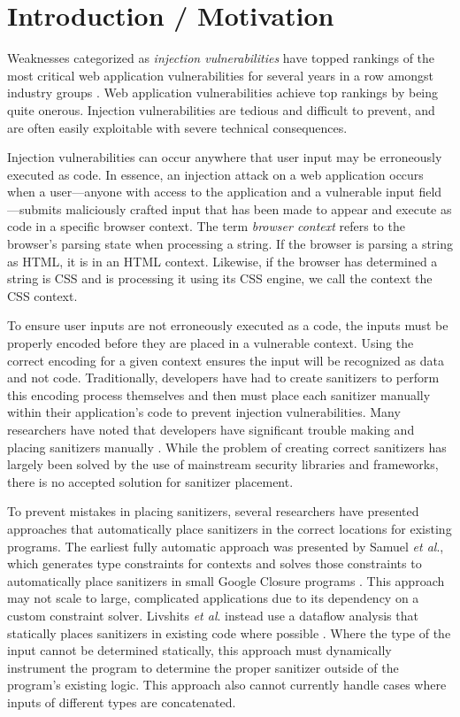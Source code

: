 
\section{Introduction / Motivation}

Weaknesses categorized as \emph{injection vulnerabilities} have topped
rankings of the most critical web application vulnerabilities for
several years in a row amongst industry groups \cite{owasp, cwsans}.
Web application vulnerabilities achieve top rankings by being quite
onerous. Injection vulnerabilities are tedious and
difficult to prevent, and are often easily exploitable with
severe technical consequences.


Injection vulnerabilities can occur anywhere that user input may be erroneously
executed as code. In essence, an injection attack on a web application
occurs when a user---anyone with access to the application and a
vulnerable input field---submits maliciously crafted input that has
been made to appear and execute as code in a specific browser context.
The term \emph{browser context} refers to the browser's parsing state
when processing a string. If the browser is parsing a string as HTML,
it is in an HTML context. Likewise, if the browser has determined
a string is CSS and is processing it using its CSS engine, we call
the context the CSS context.

To ensure user inputs are not erroneously executed as a code, the inputs
must be properly encoded before they are placed in a vulnerable context. Using 
the correct encoding for a given context ensures the input will be recognized as 
data and not code. Traditionally, developers have had to create sanitizers to perform 
this encoding process themselves and then must place each sanitizer manually within
their application's code to prevent injection vulnerabilities. Many researchers have
noted that developers have significant trouble making and placing sanitizers manually . While the problem of creating correct sanitizers has largely been solved by the use of mainstream security libraries and frameworks, there is no accepted solution for sanitizer placement.

To prevent mistakes in placing sanitizers, several researchers have presented approaches 
that automatically place sanitizers in the correct locations for existing programs. 
The earliest fully automatic approach was presented by Samuel \emph{et al}., which
generates type constraints for contexts and solves those constraints to automatically place
sanitizers in small Google Closure programs \cite{Samuel:2011}. This 
approach may not scale to large, complicated applications due to its dependency on 
a custom constraint solver. Livshits \emph{et al}. instead use a dataflow analysis that
statically places sanitizers in existing code where possible \cite{Livshits:2013}. Where the 
type of the input cannot be determined statically, this approach must dynamically instrument
the program to determine the proper sanitizer outside of the program's existing logic. This
approach also cannot currently handle cases where inputs of different types are concatenated.

